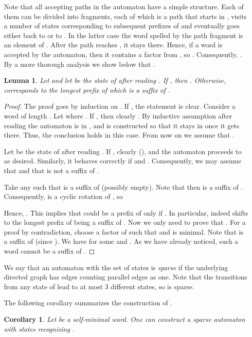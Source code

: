 \documentclass{article}
\newcommand{\mayqed}{}
\newtheorem{corollary}[theorem]{Corollary}
\newtheorem{lemma}[theorem]{Lemma}
\theoremstyle{definition}
\theoremstyle{remark}
\begin{document}
Note that all accepting paths in the automaton have a simple structure.
Each of them can be divided into fragments, each of which is a path that starts in ,
visits a number of states corresponding to subsequent prefixes of  and eventually goes either back to  or to .
In the latter case the word spelled by the path fragment is an element of .
After the path reaches , it stays there.
Hence, if a word  is accepted by the automaton, then it contains a factor from , so .
Consequently, .
By a more thorough analysis we show below that .
\begin{lemma}
  Let  and let  be the state of  after reading .
  If , then . Otherwise,  corresponds to the longest prefix of 
  which is a suffix of .
\end{lemma}
\begin{proof}
  The proof goes by induction on .
  If , the statement is clear.
  Consider a word  of length . Let  where .
  If , then clearly . By inductive assumption after reading  the automaton
  is in , and  is constructed so that it stays in  once it gets there.
  Thus, the conclusion holds in this case.
  From now on we assume that .

  Let  be the state of  after reading . If , clearly 
  (), and the automaton proceeds to  as desired.
  Similarly, it behaves correctly if  and .
  Consequently, we may assume that  and that  is not a suffix of .

  Take any  such that  is a suffix of  (possibly empty).
  Note that then  is a suffix of . 
  Consequently,  is a cyclic rotation of ,
  so
  
  Hence, .
  This implies that 
  could be a prefix of  only if .
  In particular,  indeed shifts to the longest prefix of  being a suffix of .
  Now we only need to prove that .
  For a proof by contradiction, choose a factor  of  such that  and  is minimal.
  Note that  is a suffix of  (since ). We have  for some 
  and . As we have already noticed, such a word cannot be a suffix of .
\mayqed\end{proof}

We say that an automaton with the set of states  is \emph{sparse}
if the underlying directed graph has  edges counting parallel edges as one.
Note that the transitions from any state  of  lead to at most 3 different
states, so  is sparse.

The following corollary summarizes the construction of .
\begin{corollary}\label{cor:auto}
  Let  be a self-minimal word. One can construct a sparse 
  automaton  with  states recognizing .
\end{corollary}
\end{document}
